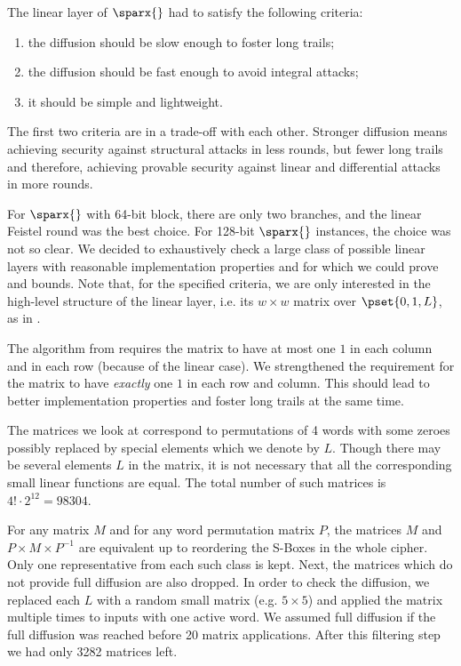 
The linear layer of $\sparx{}$ had to satisfy the following criteria:
\begin{enumerate}
    \item the diffusion should be slow enough to foster long trails;
    \item the diffusion should be fast enough to avoid integral attacks;
    \item it should be simple and lightweight.
\end{enumerate}

The first two criteria are in a trade-off with each other. Stronger diffusion means achieving security against structural attacks in less rounds, but fewer long trails and therefore, achieving provable security against linear and differential attacks in more rounds.

For $\sparx{}$ with 64-bit block, there are only two branches, and the linear Feistel round was the best choice. For 128-bit $\sparx{}$ instances, the choice was not so clear. We decided to exhaustively check a large class of possible linear layers with reasonable implementation properties and for which we could prove \medp{} and \melp{} bounds. Note that, for the specified criteria, we are only interested in the high-level structure of the linear layer, i.e. its $w \times w$ matrix over $\pset{0,1,L}$, as in .

The algorithm from  requires the matrix to have at most one $1$ in each column and in each row (because of the linear case). We strengthened the requirement for the matrix to have \emph{exactly} one $1$ in each row and column. This should lead to better implementation properties and foster long trails at the same time.  

The matrices we look at correspond to permutations of 4 words with some zeroes possibly replaced by special elements which we denote by $L$. Though there may be several elements $L$ in the matrix, it is not necessary that all the corresponding small linear functions are equal. The total number of such matrices is $4!\cdot 2^{12} = 98304$.

For any matrix $M$ and for any word permutation matrix $P$, the matrices $M$ and $P\times M \times P^{-1}$ are equivalent up to reordering the S-Boxes in the whole cipher. Only one representative from each such class is kept. Next, the matrices which do not provide full diffusion are also dropped.
In order to check the diffusion, we replaced each $L$ with a random small matrix (e.g. $5\times 5$) and applied the matrix multiple times to inputs with one active word. We assumed full diffusion if the full diffusion was reached before 20 matrix applications. After this filtering step we had only 3282 matrices left.

